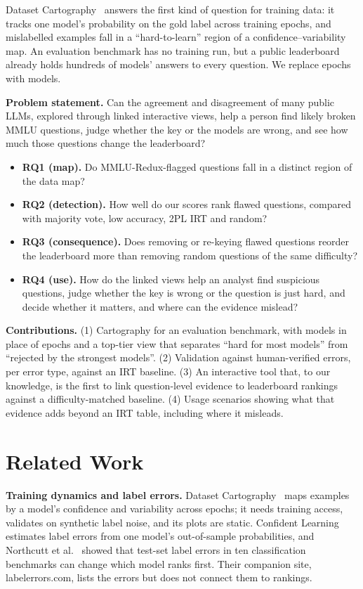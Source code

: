 \documentclass[10pt]{article}
\begin{document}
Dataset Cartography~\cite{cartography} answers the first kind of question for training data: it
tracks one model's probability on the gold label across training epochs, and mislabelled examples
fall in a ``hard-to-learn'' region of a confidence--variability map. An evaluation benchmark has no
training run, but a public leaderboard already holds hundreds of models' answers to every question.
We replace epochs with models.

\textbf{Problem statement.} Can the agreement and disagreement of many public LLMs, explored through
linked interactive views, help a person find likely broken MMLU questions, judge whether the key or
the models are wrong, and see how much those questions change the leaderboard?

\begin{itemize}
  \item \textbf{RQ1 (map).} Do MMLU-Redux-flagged questions fall in a distinct region of the data map?
  \item \textbf{RQ2 (detection).} How well do our scores rank flawed questions, compared with
    majority vote, low accuracy, 2PL IRT and random?
  \item \textbf{RQ3 (consequence).} Does removing or re-keying flawed questions reorder the
    leaderboard more than removing random questions of the same difficulty?
  \item \textbf{RQ4 (use).} How do the linked views help an analyst find suspicious questions, judge
    whether the key is wrong or the question is just hard, and decide whether it matters, and where
    can the evidence mislead?
\end{itemize}

\textbf{Contributions.} (1) Cartography for an evaluation benchmark, with models in place of epochs
and a top-tier view that separates ``hard for most models'' from ``rejected by the strongest
models''. (2) Validation against human-verified errors, per error type, against an IRT baseline.
(3) An interactive tool that, to our knowledge, is the first to link question-level evidence to
leaderboard rankings against a difficulty-matched baseline. (4) Usage scenarios showing what that evidence
adds beyond an IRT table, including where it misleads.

\section{Related Work}

\textbf{Training dynamics and label errors.} Dataset Cartography~\cite{cartography} maps examples by
a model's confidence and variability across epochs; it needs training access, validates on
synthetic label noise, and its plots are static. Confident Learning~\cite{cl} estimates label errors
from one model's out-of-sample probabilities, and Northcutt et al.~\cite{pervasive} showed that
test-set label errors in ten classification benchmarks can change which model ranks first. Their
companion site, labelerrors.com, lists the errors but does not connect them to rankings.
\end{document}
